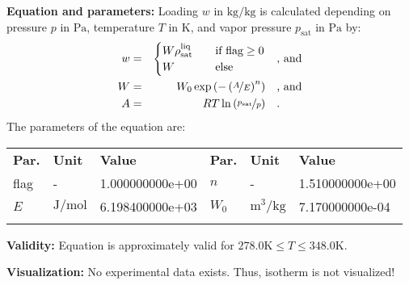 \textbf{Equation and parameters:}
\newline
%
Loading $w$ in $\si{\kilogram\per\kilogram}$ is calculated depending on pressure $p$ in $\si{\pascal}$, temperature $T$ in $\si{\kelvin}$, and vapor pressure $p_\mathrm{sat}$ in $\si{\pascal}$ by:
%
\begin{equation*}
\begin{split}
w &=& \begin{cases} W \rho_\mathrm{sat}^{\mathrm{liq}} & \quad \text{if flag} \geq 0 \\ W & \quad \text{else} \end{cases} & \quad\text{, and} \\
W &=& W_0 \exp \left( - \left( \nicefrac{A}{E} \right) ^{n} \right) & \quad\text{, and} \\
A &=& R T \ln \left( \nicefrac{p_\mathrm{sat}}{p} \right) & \quad\text{.} \\
\end{split}
\end{equation*}
%
The parameters of the equation are:
%
\begin{longtable}[l]{lll|lll}
\toprule
\addlinespace
\textbf{Par.} & \textbf{Unit} & \textbf{Value} &	\textbf{Par.} & \textbf{Unit} & \textbf{Value} \\
\addlinespace
\midrule
\endhead

\bottomrule
\endfoot
\bottomrule
\endlastfoot
\addlinespace

flag & - & 1.000000000e+00 & $n$ & - & 1.510000000e+00 \\
$E$ & $\si{\joule\per\mole}$ & 6.198400000e+03 & $W_0$ & $\si{\cubic\meter\per\kilogram}$ & 7.170000000e-04 \\

\addlinespace\end{longtable}

\textbf{Validity:}
\newline
Equation is approximately valid for $278.0 \si{\kelvin} \leq T \leq 348.0 \si{\kelvin}$.
\newline

\textbf{Visualization:}
%
\newline
No experimental data exists. Thus, isotherm is not visualized!
%

\FloatBarrier
\newpage
